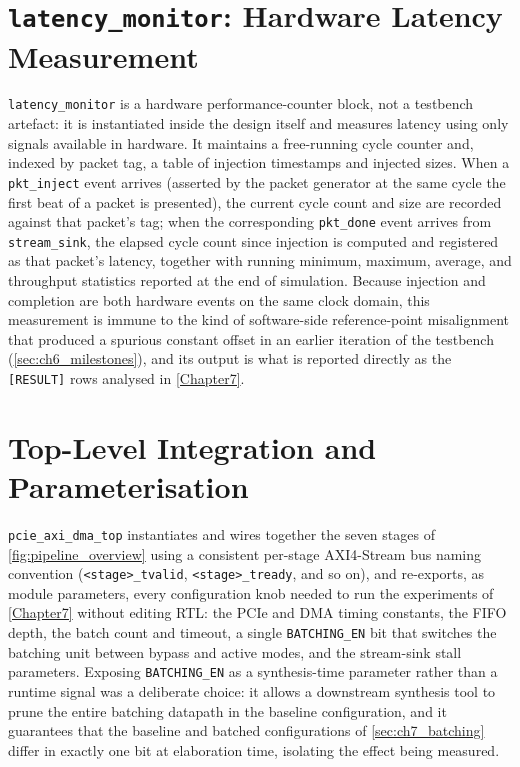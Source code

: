 \section{\texttt{latency\_monitor}: Hardware Latency Measurement}
\label{sec:ch4_latency_monitor}

\texttt{latency\_monitor} is a hardware performance-counter block, not a testbench artefact: it is instantiated inside the design itself and measures latency using only signals available in hardware. It maintains a free-running cycle counter and, indexed by packet tag, a table of injection timestamps and injected sizes. When a \texttt{pkt\_inject} event arrives (asserted by the packet generator at the same cycle the first beat of a packet is presented), the current cycle count and size are recorded against that packet's tag; when the corresponding \texttt{pkt\_done} event arrives from \texttt{stream\_sink}, the elapsed cycle count since injection is computed and registered as that packet's latency, together with running minimum, maximum, average, and throughput statistics reported at the end of simulation. Because injection and completion are both hardware events on the same clock domain, this measurement is immune to the kind of software-side reference-point misalignment that produced a spurious constant offset in an earlier iteration of the testbench (\autoref{sec:ch6_milestones}), and its output is what is reported directly as the \texttt{[RESULT]} rows analysed in \autoref{Chapter7}.


\section{Top-Level Integration and Parameterisation}
\label{sec:ch4_top}

\texttt{pcie\_axi\_dma\_top} instantiates and wires together the seven stages of \autoref{fig:pipeline_overview} using a consistent per-stage AXI4-Stream bus naming convention (\texttt{<stage>\_tvalid}, \texttt{<stage>\_tready}, and so on), and re-exports, as module parameters, every configuration knob needed to run the experiments of \autoref{Chapter7} without editing RTL: the PCIe and DMA timing constants, the FIFO depth, the batch count and timeout, a single \texttt{BATCHING\_EN} bit that switches the batching unit between bypass and active modes, and the stream-sink stall parameters. Exposing \texttt{BATCHING\_EN} as a synthesis-time parameter rather than a runtime signal was a deliberate choice: it allows a downstream synthesis tool to prune the entire batching datapath in the baseline configuration, and it guarantees that the baseline and batched configurations of \autoref{sec:ch7_batching} differ in exactly one bit at elaboration time, isolating the effect being measured.
